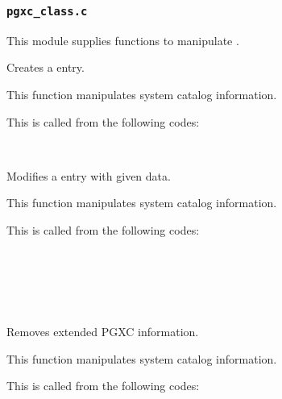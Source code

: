 \subsubsection{\texttt{pgxc\_class.c}}

  This module supplies functions to manipulate .
  
  
    Creates a  entry.
    
    This function manipulates  system catalog information.
    
    This is called from the following codes:
    
    \FuncRefHdr
		\\ \hline
    \FuncRefTrailor
  
  
    Modifies a  entry with given data.
    
    This function manipulates  system catalog information.
    
    This is called from the following codes:
    
    \FuncRefHdr
		\\
		\\
		\\
		\\
		\hline
    \FuncRefTrailor
  
  
    Removes extended PGXC information.
    
    This function manipulates  system  catalog information.
    
    This is called from the following codes:
    
    \FuncRefHdr
		\\ \hline
    \FuncRefTrailor
  


